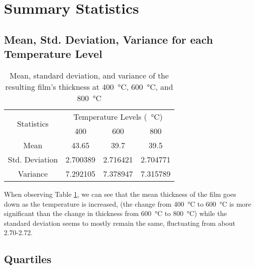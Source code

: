 \documentclass[letterpaper]{article}
\begin{document}
\section{Summary Statistics}
\label{sec2}
\subsection{Mean, Std. Deviation, Variance for each Temperature Level}

\begin{table}[H]
 \centering
 \begin{tabular}{c|c|c|c|}
  \multirow{2}{*}{Statistics} & \multicolumn{3}{c|}{Temperature Levels (\SI{}{\celsius})}                       \\ \cline{2-4}
                              & 400                                                       & 600      & 800      \\ \hline
  Mean                        & 43.65                                                     & 39.7     & 39.5     \\ \hline
  Std. Deviation              & 2.700389                                                  & 2.716421 & 2.704771 \\ \hline
  Variance                    & 7.292105                                                  & 7.378947 & 7.315789 \\ \hline
 \end{tabular}
 \caption{Mean, standard deviation, and variance of the resulting film's thickness at \SI{400}{\celsius}, \SI{600}{\celsius}, and \SI{800}{\celsius}}
 \label{tempmean}
\end{table}

When observing Table \ref{tempmean}, we can see that the mean thickness of the film goes down as the temperature
is increased, (the change from \SI{400}{\celsius} to \SI{600}{\celsius} is more significant than the change in thickness from \SI{600}{\celsius} to \SI{800}{\celsius}) while the standard deviation seems to mostly remain the same,
fluctuating from about 2.70-2.72.

\subsection{Quartiles}
\end{document}
